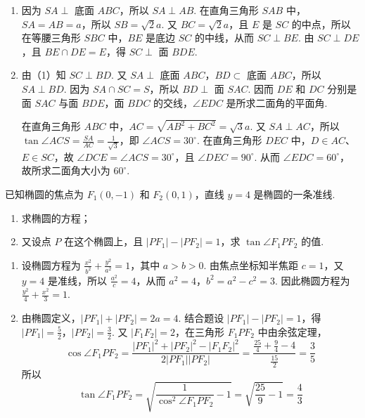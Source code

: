 \begin{solution}
\begin{enumerate}
\item 因为 \(SA\perp\) 底面 \(ABC\)，所以 \(SA\perp AB\). 在直角三角形 \(SAB\) 中，\(SA=AB=a\)，所以 \(SB=\sqrt{2}a\). 又 \(BC=\sqrt{2}a\)，且 \(E\) 是 \(SC\) 的中点，所以在等腰三角形 \(SBC\) 中，\(BE\) 是底边 \(SC\) 的中线，从而 \(SC\perp BE\). 由 \(SC\perp DE\)，且 \(BE\cap DE=E\)，得 \(SC\perp\) 面 \(BDE\).

\item 由（1）知 \(SC\perp BD\). 又 \(SA\perp\) 底面 \(ABC\)，\(BD\subset\) 底面 \(ABC\)，所以 \(SA\perp BD\). 因为 \(SA\cap SC=S\)，所以 \(BD\perp\) 面 \(SAC\). 因而 \(DE\) 和 \(DC\) 分别是面 \(SAC\) 与面 \(BDE\)，面 \(BDC\) 的交线，\(\angle EDC\) 是所求二面角的平面角.

在直角三角形 \(ABC\) 中，\(AC=\sqrt{AB^2+BC^2}=\sqrt{3}a\). 又 \(SA\perp AC\)，所以 \(\tan\angle ACS=\frac{SA}{AC}=\frac{1}{\sqrt{3}}\)，即 \(\angle ACS=30^{\circ}\). 在直角三角形 \(DEC\) 中，\(D\in AC\)、\(E\in SC\)，故 \(\angle DCE=\angle ACS=30^{\circ}\)，且 \(\angle DEC=90^{\circ}\). 从而 \(\angle EDC=60^{\circ}\)，故所求二面角大小为 \(60^{\circ}\).
\end{enumerate}
\end{solution}

\begin{problem}
已知椭圆的焦点为 \(F_1(0,-1)\) 和 \(F_2(0,1)\)，直线 \(y=4\) 是椭圆的一条准线.
\begin{enumerate}
\item 求椭圆的方程；
\item 又设点 \(P\) 在这个椭圆上，且 \(\left| PF_1 \right|-\left| PF_2 \right|=1\)，求 \(\tan\angle F_1PF_2\) 的值.
\end{enumerate}
\end{problem}

\begin{solution}
\begin{enumerate}
\item 设椭圆方程为 \(\frac{x^2}{b^2}+\frac{y^2}{a^2}=1\)，其中 \(a>b>0\). 由焦点坐标知半焦距 \(c=1\)，又 \(y=4\) 是准线，所以 \(\frac{a^2}{c}=4\)，从而 \(a^2=4\)，\(b^2=a^2-c^2=3\). 因此椭圆方程为 \(\frac{y^2}{4}+\frac{x^2}{3}=1\).

\item 由椭圆定义，\(\left|PF_1\right|+\left|PF_2\right|=2a=4\). 结合题设 \(\left|PF_1\right|-\left|PF_2\right|=1\)，得 \(\left|PF_1\right|=\frac{5}{2}\)，\(\left|PF_2\right|=\frac{3}{2}\). 又 \(\left|F_1F_2\right|=2\)，在三角形 \(F_1PF_2\) 中由余弦定理，
\[
\cos\angle F_1PF_2
=\frac{\left|PF_1\right|^2+\left|PF_2\right|^2-\left|F_1F_2\right|^2}{2\left|PF_1\right|\left|PF_2\right|}
=\frac{\frac{25}{4}+\frac{9}{4}-4}{\frac{15}{2}}
=\frac{3}{5}
\]
所以
\[
\tan\angle F_1PF_2
 =\sqrt{\frac{1}{\cos^2\angle F_1PF_2}-1}
 =\sqrt{\frac{25}{9}-1}
 =\frac{4}{3}
\]
\end{enumerate}
\end{solution}

